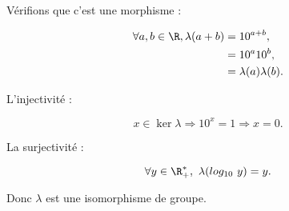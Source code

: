 Vérifions que c'est une morphisme :

\begin{align*}
    \forall a,b \in \R, \lambda(a+b) &= 10^{a+b}, \\
    &=10^a 10^b, \\
    &=\lambda(a)\lambda(b).
\end{align*}

L'injectivité :

\[x \in \ker \lambda \Rightarrow 10^x = 1 \Rightarrow x = 0.\]

La surjectivité :

\[\forall y\in \R_+^*,\ \lambda(log_{10}\ y) = y.\]

Donc $\lambda$ est une isomorphisme de groupe.